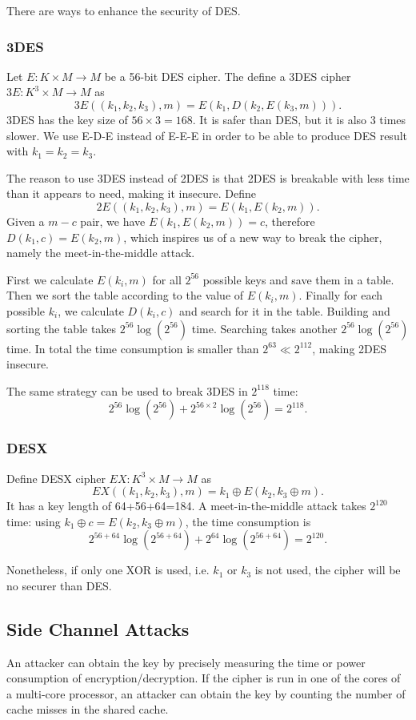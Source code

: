 There are ways to enhance the security of DES. 
\subsubsection{3DES}
Let $E:K\times M\rightarrow M$ be a 56-bit DES cipher. The define a 3DES cipher $3E:K^{3}\times M\rightarrow M$ as 
\[3E((k_1,k_2,k_3),m)=E(k_1,D(k_2,E(k_3,m))).\]
3DES has the key size of $56\times 3=168$. It is safer than DES, but it is also 3 times slower. We use E-D-E instead of E-E-E in order to be able to produce DES result with $k_1=k_2=k_3$.

The reason to use 3DES instead of 2DES is that 2DES is breakable with less time than it appears to need, making it insecure. Define 
\[2E((k_1,k_2,k_3),m)=E(k_1,E(k_2,m)).\]
Given a $m-c$ pair, we have 
$E(k_1,E(k_2,m))=c$, therefore $D(k_1,c)=E(k_2,m)$, which inspires us of a new way to break the cipher, namely the meet-in-the-middle attack. 

First we calculate $E(k_i,m)$ for all $2^{56}$ possible keys and save them in a table. Then we sort the table according to the value of $E(k_i,m)$. Finally for each possible $k_i$, we calculate $D(k_i,c)$ and search for it in the table. Building and sorting the table takes $2^{56}\log(2^56)$ time. Searching takes another $2^56\log(2^{56})$ time. In total the time consumption is smaller than $2^63\ll 2^112$, making 2DES insecure.

The same strategy can be used to break 3DES in $2^{118}$ time:
\[2^{56}\log(2^{56})+2^{56\times 2}\log(2^{56})=2^{118}.\]
\subsubsection{DESX}
Define DESX cipher $EX:K^{3}\times M\rightarrow M$ as 
\[EX((k_1,k_2,k_3),m)=k_1\oplus E(k_2,k_3\oplus m).\]
It has a key length of 64+56+64=184. A meet-in-the-middle attack takes $2^{120}$ time: using $k_1\oplus c=E(k_2,k_3\oplus m)$, the time consumption is 
\[2^{56+64}\log(2^{56+64})+2^{64}\log(2^{56+64})=2^{120}.\]

Nonetheless, if only one XOR is used, i.e. $k_1$ or $k_3$ is not used, the cipher will be no securer than DES.
\subsection{Side Channel Attacks}
An attacker can obtain the key by precisely measuring the time or power consumption of encryption/decryption. If the cipher is run in one of the cores of a multi-core processor, an attacker can obtain the key by counting the number of cache misses in the shared cache. 
